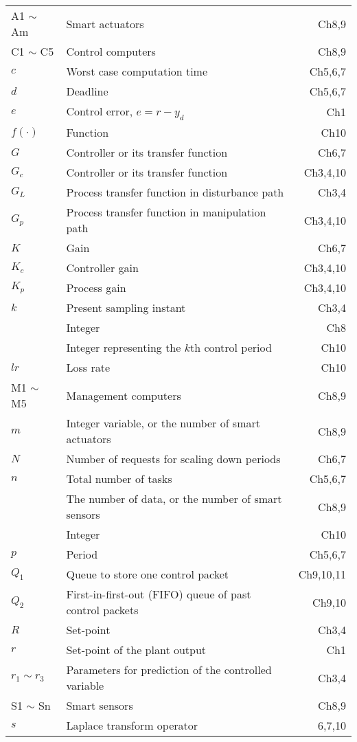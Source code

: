 {\begin{longtable}{llr}
A1 $\sim$ Am & Smart actuators & Ch8,9\\
C1 $\sim$ C5 & Control computers & Ch8,9\\
{$c$}  & {Worst case computation time} & Ch5,6,7\\
{$d$}  & Deadline & Ch5,6,7\\
$e$ & Control error, $e = r - y_d$ & Ch1\\
$f(\cdot)$ & Function & Ch10\\
$G$ & Controller or its transfer function & Ch6,7\\
{$G_c$} & {Controller or its transfer function}& Ch3,4,10\\
{$G_L$} & {Process transfer function in disturbance path}& Ch3,4\\
{$G_p$} & {Process transfer function in manipulation path}& Ch3,4,10\\
$K$ & Gain & Ch6,7\\
$K_c$ & Controller gain & Ch3,4,10\\
$K_p$ & Process gain & Ch3,4,10\\
{$k$} & {Present sampling instant}& Ch3,4\\
      & Integer & Ch8\\
      & Integer representing the $k$th control period & Ch10\\
$lr$ & Loss rate & Ch10\\
M1 $\sim$ M5 & Management computers & Ch8,9\\
$m$ & Integer variable, or the number of smart actuators & Ch8,9\\
$N$ & Number of requests for scaling down periods & Ch6,7\\  
$n$ & Total number of tasks & Ch5,6,7\\
    & The number of data, or the number of smart sensors & Ch8,9\\
    & Integer & Ch10\\
$p$ & Period & Ch5,6,7\\
$Q_1$ & Queue to store one control packet & Ch9,10,11\\
$Q_2$ & First-in-first-out (FIFO) queue of past control packets & Ch9,10\\
{$R$} & {Set-point}& Ch3,4\\
$r$ & Set-point of the plant output & Ch1\\
{$r_1 \sim r_3$} & {Parameters for prediction of the controlled variable}& Ch3,4\\
S1 $\sim$ Sn & Smart sensors & Ch8,9\\
$s$ & Laplace transform operator & 6,7,10\\

\end{longtable}}
